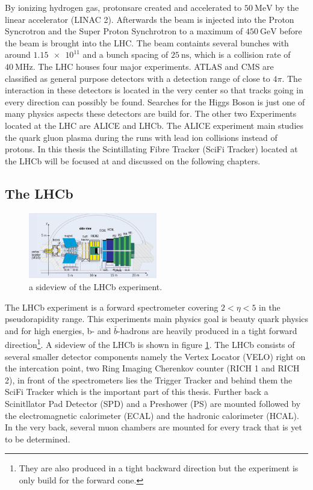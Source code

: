 By ionizing hydrogen gas, protonsare created and accelerated to $\SI{50}{\mega\electronvolt}$ by the linear accelerator (LINAC 2). Afterwards the beam is injected into the Proton Syncrotron and the Super Proton Synchrotron to a maximum of $\SI{450}{\giga\electronvolt}$ before the beam is brought into the LHC.
The beam containts several bunches with around $\num{1.15e11}$ and a bunch spacing of $\SI{25}{\nano\second}$, which is a collision rate of $\SI{40}{\mega\hertz}$.
The LHC houses four major experiments. ATLAS and CMS are classified as general purpose detectors with a detection range of close to $4\pi$. The interaction in these detectors is located in the very center so that tracks going in every direction can possibly be found. Searches for the Higgs Boson is just one of many physics aspects these detectors are build for.
The other two Experiments located at the LHC are ALICE and LHCb.
The ALICE experiment main studies the quark gluon plasma during the runs with lead ion collisions instead of protons.
In this thesis the Scintillating Fibre Tracker (SciFi Tracker) located at the LHCb will be focused at and discussed on the following chapters.

\subsection{The LHCb}

\begin{figure}
  \centering
  \includegraphics[width=0.5\textwidth]{plots/LHCb_facility.jpg}
  \caption{a sideview of the LHCb experiment.}
  \label{fig:LHCb}
\end{figure}

The LHCb experiment\cite{lhcbInfo} is a forward spectrometer covering $2 \less \eta \less 5$ in the pseudorapidity range. This experiments main physics goal is beauty quark physics and for high energies, b- and $\bar{b}$-hadrons are heavily produced in a tight forward direction\footnote{They are also produced in a tight backward direction but the experiment is only build for the forward cone.}. A sideview of the LHCb is shown in figure \ref{fig:LHCb}.
The LHCb consists of several smaller detector components namely the Vertex Locator (VELO) right on the intercation point, two Ring Imaging Cherenkov counter (RICH 1 and RICH 2), in front of the spectrometers lies the Trigger Tracker and behind them the SciFi Tracker which is the important part of this thesis. Further back a Scinitllator Pad Detector (SPD) and a Preshower (PS) are mounted followed by the electromagnetic calorimeter (ECAL) and the hadronic calorimeter (HCAL). In the very back, several muon chambers are mounted for every track that is yet to be determined.


